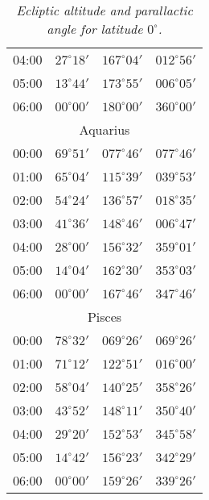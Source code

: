 \begin{table}
\begin{Parallel}{}{}
{{\begin{tabular}{l|lll}
04:00 & $27^\circ 18'$ & $167^\circ 04'$& $012^\circ 56'$ \\
05:00 & $13^\circ 44'$ & $173^\circ 55'$& $006^\circ 05'$ \\
06:00 & $00^\circ 00'$ & $180^\circ 00'$& $360^\circ 00'$ \\
\multicolumn{4}{c}{Aquarius}\\
00:00 & $69^\circ 51'$ & $077^\circ 46'$& $077^\circ 46'$ \\
01:00 & $65^\circ 04'$ & $115^\circ 39'$& $039^\circ 53'$ \\
02:00 & $54^\circ 24'$ & $136^\circ 57'$& $018^\circ 35'$ \\
03:00 & $41^\circ 36'$ & $148^\circ 46'$& $006^\circ 47'$ \\
04:00 & $28^\circ 00'$ & $156^\circ 32'$& $359^\circ 01'$ \\
05:00 & $14^\circ 04'$ & $162^\circ 30'$& $353^\circ 03'$ \\
06:00 & $00^\circ 00'$ & $167^\circ 46'$& $347^\circ 46'$ \\
\multicolumn{4}{c}{Pisces}\\
00:00 & $78^\circ 32'$ & $069^\circ 26'$& $069^\circ 26'$ \\
01:00 & $71^\circ 12'$ & $122^\circ 51'$& $016^\circ 00'$ \\
02:00 & $58^\circ 04'$ & $140^\circ 25'$& $358^\circ 26'$ \\
03:00 & $43^\circ 52'$ & $148^\circ 11'$& $350^\circ 40'$ \\
04:00 & $29^\circ 20'$ & $152^\circ 53'$& $345^\circ 58'$ \\
05:00 & $14^\circ 42'$ & $156^\circ 23'$& $342^\circ 29'$ \\
06:00 & $00^\circ 00'$ & $159^\circ 26'$& $339^\circ 26'$ \\
\end{tabular}
}}
\end{Parallel}
\caption{\em Ecliptic altitude and parallactic angle for latitude $0^\circ$.}\label{ltxx}
\end{table}

